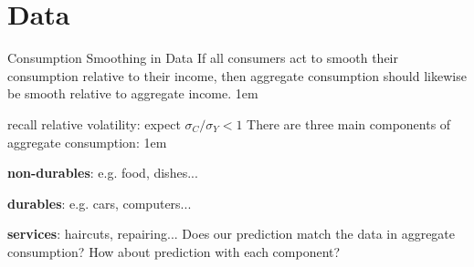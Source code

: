 \documentclass[11pt,aspectratio=43]{beamer}
\let\olditemize=\itemize
\let\endolditemize=\enditemize
\renewenvironment{itemize}{\olditemize \itemsep1em}{\endolditemize}
\let\oldenumerate=\enumerate
\let\endoldenumerate=\endenumerate
\renewenvironment{enumerate}{\oldenumerate \itemsep1em}{ \endoldenumerate}
\theoremstyle{definition}
\begin{document}
\section{Data}
\label{sec:Data}

\begin{frame}{Consumption Smoothing in Data}
\label{slide:Consumption_Smoothing_in_Data}
    If all consumers act to smooth their consumption relative to their income, then
\alert{aggregate consumption} should likewise be smooth relative to \alert{aggregate income}.
    \begin{itemize}
        \item recall relative volatility: expect $ \sigma_{C}/\sigma_{Y} < 1 $
    \end{itemize}
    There are three main components of aggregate consumption:
    \begin{enumerate}
        \item \textbf{non-durables}: e.g. food, dishes...
        \item \textbf{durables}: e.g. cars, computers...
        \item \textbf{services}: haircuts, repairing...
    \end{enumerate}
    Does our prediction match the data in aggregate consumption? How about prediction with each component?
\end{frame}
\end{document}
